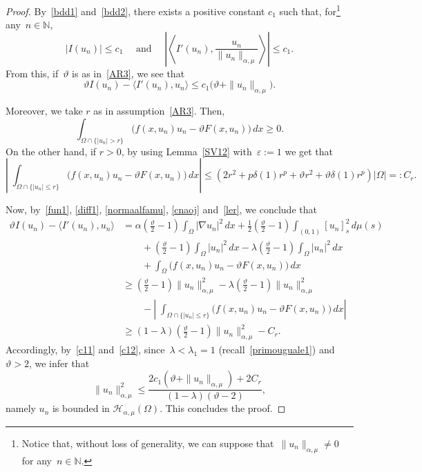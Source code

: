 \documentclass[12pt,a4paper,intlimits,sumlimits]{amsart}
\def \N {\mathbb{N}}
\theoremstyle{definition}
\theoremstyle{plain}
\numberwithin{equation}{section}
\renewcommand{\le}{\leqslant}
\renewcommand{\ge}{\geqslant}
\begin{document}
\begin{proof}
By~\eqref{bdd1} and~\eqref{bdd2}, there exists a positive constant $c_1$ such that, for\footnote{Notice that, without loss of generality, we can suppose that~$\|u_n\|_{\alpha, \mu}\neq0$ for any~$n\in\N$.} any~$n\in\N$,
\begin{equation*}
|I(u_n)|\le c_1\quad\mbox{ and }\quad \left|\left\langle I'(u_n), \frac{u_n}{\|u_n\|_{\alpha, \mu}}\right\rangle\right|\le c_1.
\end{equation*}
{F}rom this, if~$\vartheta$ is as in~\eqref{AR3}, we see that
\begin{equation}\label{c11}
\vartheta I(u_n) - \langle I'(u_n), u_n\rangle \le c_1\big(\vartheta +\|u_n\|_{\alpha, \mu}\big).
\end{equation}

Moreover, we take $r$ as in assumption~\eqref{AR3}. 
Then,
\begin{equation}\label{cnaoj}
\int_{\Omega \cap\{|u_n|> r\}}\Big(f(x, u_n) u_n -\vartheta F(x, u_n)\Big)\,dx \ge 0.
\end{equation}
On the other hand, if $r>0$, by using Lemma~\ref{SV12} with~$\varepsilon:=1$ we get that
\begin{equation}\label{ler}
\left|\;\int_{\Omega\cap\{|u_n|\le r\}}  \Big(f(x, u_n) u_n -\vartheta F(x, u_n)\Big) \,dx\right| \le \left(2r^2 +p\delta(1) r^p +\vartheta r^2 +\vartheta\delta(1) r^p\right)|\Omega|=:C_r.
\end{equation}

Now, by~\eqref{fun1}, \eqref{diff1}, \eqref{normaalfamu}, \eqref{cnaoj} and~\eqref{ler}, we conclude that
\begin{equation}\label{c12}
\begin{split}
\vartheta I(u_n) - \langle I'(u_n), u_n\rangle & =\alpha\left(\frac{\vartheta}{2} -1\right) \int_\Omega |\nabla u_n|^2 \,dx +\frac12 \left(\frac{\vartheta}{2} -1\right) \int_{(0, 1)} [u_n]^2_s \, d\mu(s)\\
&\qquad +\left(\frac{\vartheta}{2} -1\right) \int_\Omega |u_n|^2 \,dx -\lambda\left(\frac{\vartheta}{2} -1\right) \int_\Omega |u_n|^2 \,dx\\
&\qquad +\int_\Omega \Big(f(x, u_n)u_n -\vartheta F(x, u_n)\Big) \,dx\\
&\ge \left(\frac{\vartheta}{2} -1\right) \|u_n\|^2_{\alpha, \mu} -\lambda\left(\frac{\vartheta}{2} -1\right)  \|u_n\|^2_{\alpha, \mu}\\
&\qquad-\left|\;\int_{\Omega\cap\{|u_n|\le r\}}  \Big(f(x, u_n) u_n -\vartheta F(x, u_n)\Big) \,dx\right| \\
&\ge(1-\lambda)\left(\frac{\vartheta}{2} -1\right) \|u_n\|^2_{\alpha, \mu} -C_r.
\end{split}
\end{equation}
Accordingly, by~\eqref{c11} and~\eqref{c12}, since~$\lambda<\lambda_1=1$ (recall~\eqref{primouguale1}) and~$\vartheta>2$, we infer that
\begin{equation}\label{diverso}
\|u_n\|^2_{\alpha, \mu} \le \frac{2 c_1(\vartheta +\|u_n\|_{\alpha, \mu}) +2C_r} {(1-\lambda)(\vartheta-2)},
\end{equation}
namely $u_n$ is bounded in $\mathcal{H}_{\alpha, \mu}(\Omega)$. This concludes the proof.
\end{proof}
\end{document}
